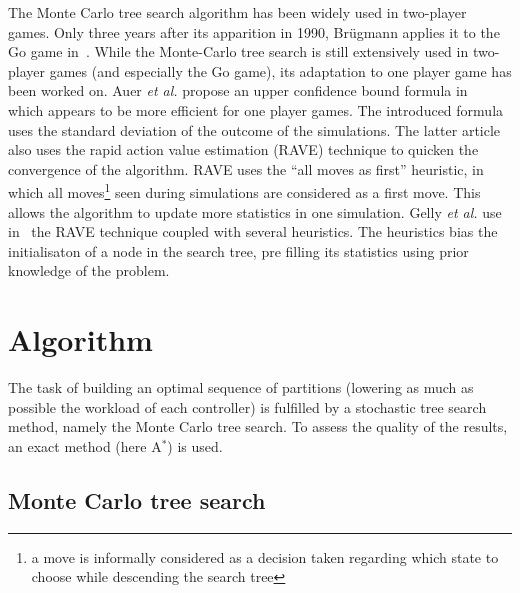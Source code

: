 \documentclass[oneside,twocolumn]{article}
\begin{document}
The Monte Carlo tree search algorithm has been widely used in two-player games.
Only three years after its apparition in 1990, Br\"ugmann applies it to the Go
game in~\cite{brugmann1993mcgo}. While the Monte-Carlo tree search is still
extensively used in two-player games (and especially the Go game), its
adaptation to one player game has been worked on. Auer \textit{et al.} propose
an
upper confidence bound formula in~\cite{sebag2010fuse} which appears to be more
efficient for one player games. The introduced formula uses the standard
deviation of the outcome of the simulations.
The latter article also uses the rapid
action value estimation (RAVE) technique to quicken the convergence of the
algorithm. RAVE uses the ``all moves as first'' heuristic, in which all
moves\footnote{a move is informally considered as a decision taken regarding
which state to choose while descending the search tree}
seen during simulations are considered as a first move. This allows the
algorithm to update more statistics in one simulation. Gelly \textit{et al.} use
in~\cite{gelly2012grand} the RAVE technique coupled with several heuristics. The
heuristics bias the initialisaton of a node in the search tree, pre filling its
statistics using prior knowledge of the problem.

\section{Algorithm}

The task of building an optimal sequence of partitions (lowering
as much as possible the workload of each controller) is fulfilled by a
stochastic tree search method, namely the Monte Carlo tree search. To assess the
quality of the results, an exact method (here A\(^*\)) is used.

\subsection{Monte Carlo tree search}
\end{document}
